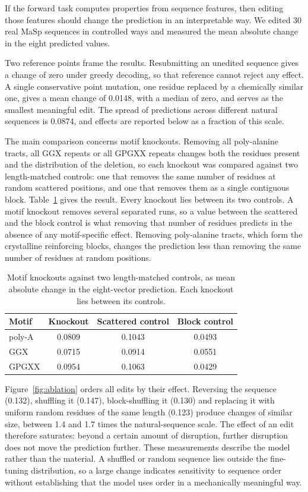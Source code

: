 \documentclass[11pt,a4paper]{article}
\begin{document}
If the forward task computes properties from sequence features, then editing
those features should change the prediction in an interpretable way. We edited 30
real MaSp sequences in controlled ways and measured the mean absolute change in
the eight predicted values.

Two reference points frame the results. Resubmitting an unedited sequence gives a
change of zero under greedy decoding, so that reference cannot reject any effect.
A single conservative point mutation, one residue replaced by a chemically
similar one, gives a mean change of 0.0148, with a median of zero, and serves as
the smallest meaningful edit. The spread of predictions across different natural
sequences is 0.0874, and effects are reported below as a fraction of this scale.

The main comparison concerns motif knockouts. Removing all poly-alanine tracts,
all GGX repeats or all GPGXX repeats changes both the residues present and the
distribution of the deletion, so each knockout was compared against two
length-matched controls: one that removes the same number of residues at random
scattered positions, and one that removes them as a single contiguous block.
Table~\ref{tab:knockout} gives the result. Every knockout lies between its two
controls. A motif knockout removes several separated runs, so a value between the
scattered and the block control is what removing that number of residues predicts
in the absence of any motif-specific effect. Removing poly-alanine tracts, which
form the crystalline reinforcing blocks, changes the prediction less than
removing the same number of residues at random positions.

\begin{table}[htbp]
\centering
\small
\caption{Motif knockouts against two length-matched controls, as mean absolute
change in the eight-vector prediction. Each knockout lies between its controls.}
\label{tab:knockout}
\begin{tabular}{lccc}
\toprule
Motif & Knockout & Scattered control & Block control \\
\midrule
poly-A & 0.0809 & 0.1043 & 0.0493 \\
GGX & 0.0715 & 0.0914 & 0.0551 \\
GPGXX & 0.0954 & 0.1063 & 0.0429 \\
\bottomrule
\end{tabular}
\end{table}

Figure~\ref{fig:ablation} orders all edits by their effect. Reversing the
sequence (0.132), shuffling it (0.147), block-shuffling it (0.130) and replacing
it with uniform random residues of the same length (0.123) produce changes of
similar size, between 1.4 and 1.7 times the natural-sequence scale. The effect of
an edit therefore saturates: beyond a certain amount of disruption, further
disruption does not move the prediction further. These measurements describe the
model rather than the material. A shuffled or random sequence lies outside the
fine-tuning distribution, so a large change indicates sensitivity to sequence
order without establishing that the model uses order in a mechanically
meaningful way.
\end{document}
